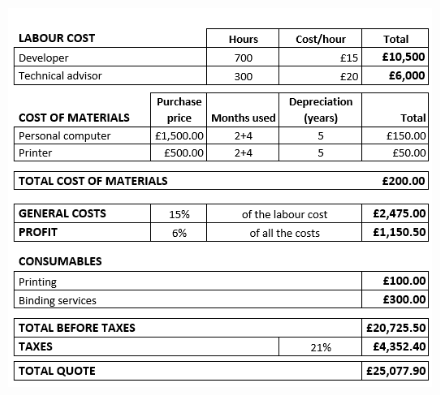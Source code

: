 

\begin{figure}[H]
	\begin{Center}
		\includegraphics[width=1\textwidth]{./media/Screenshot_2.png}
	\end{Center}
\end{figure}




\vspace{\baselineskip}
